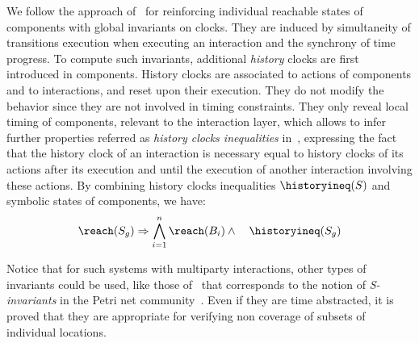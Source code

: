 
We follow the approach of~\cite{DBLP:conf/tacas/AstefanoaeiRBBC14,RTD-FINDER,veriRepo} for reinforcing individual reachable states of components
with global invariants on clocks.
They are induced by simultaneity of transitions execution when executing an interaction and the synchrony of time progress.
To compute such invariants, additional \emph{history} clocks are first introduced in components.
History clocks are associated to actions of components and to interactions, and reset upon their execution.
They do not modify the behavior since they are not involved in timing constraints.
They only reveal local timing of components, relevant to the interaction layer, which allows to infer further properties referred as \emph{history clocks inequalities} in~\cite{DBLP:conf/tacas/AstefanoaeiRBBC14}, expressing the fact that the history clock of an interaction is necessary equal to history clocks of its actions after its execution and until the execution of another interaction involving these actions.
By combining history clocks inequalities $\historyineq(S)$ and symbolic states of components, we have: 
  \begin{equation}
    \label{eq:r2}
    \reach(S_g)\Rightarrow\bigwedge_{i=1}^n \reach(B_i)\wedge\quad\historyineq(S_g)
  \end{equation}

  Notice that for such systems with multiparty interactions, other types of invariants could be used, like those of~\cite{lin-inv} that corresponds to the notion of \emph{S-invariants} in the Petri net community~\cite{MurataPetriNet}.
  Even if they are time abstracted, it is proved that they are appropriate for verifying non coverage of subsets of individual locations.

